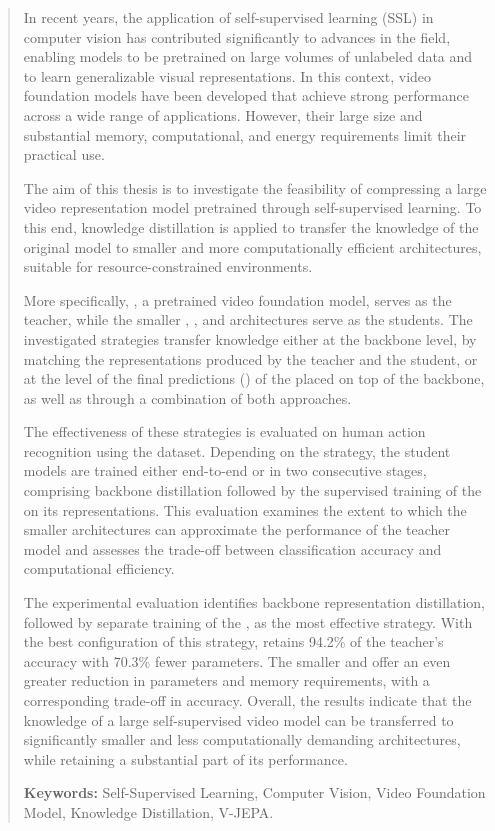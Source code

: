 \begin{abstract}

In recent years, the application of self-supervised learning (SSL) in
computer vision has contributed significantly to advances in the field,
enabling models to be pretrained on large volumes of unlabeled data and to
learn generalizable visual representations. In this context, video
foundation models have been developed that achieve strong performance across
a wide range of applications. However, their large size and substantial
memory, computational, and energy requirements limit their practical use.

The aim of this thesis is to investigate the feasibility of compressing a
large video representation model pretrained through self-supervised learning.
To this end, knowledge distillation is applied to transfer the knowledge of
the original model to smaller and more computationally efficient
architectures, suitable for resource-constrained environments.

More specifically, , a pretrained video foundation model,
serves as the teacher, while the smaller , , and
 architectures serve as the students. The investigated strategies
transfer knowledge either at the backbone level, by matching the
representations produced by the teacher and the student, or at the level
of the final predictions () of the 
placed on top of the backbone, as well as through a combination of both
approaches.

The effectiveness of these strategies is evaluated on human action
recognition using the  dataset. Depending on the strategy, the
student models are trained either end-to-end or in two consecutive stages,
comprising backbone distillation followed by the supervised training of the
 on its representations. This evaluation examines
the extent to which the smaller architectures can approximate the
performance of the teacher model and assesses the trade-off between
classification accuracy and computational efficiency.

The experimental evaluation identifies backbone representation
distillation, followed by separate training of the
, as the most effective strategy. With the best
configuration of this strategy,  retains 94.2\% of the
teacher's accuracy with 70.3\% fewer parameters. The smaller
 and  offer an even greater reduction in
parameters and memory requirements, with a corresponding trade-off in
accuracy. Overall, the results indicate that the knowledge of a large
self-supervised video model can be transferred to significantly smaller and
less computationally demanding architectures, while retaining a substantial
part of its performance.

\noindent\textbf{Keywords:} Self-Supervised Learning, Computer Vision, Video Foundation Model, Knowledge Distillation, V-JEPA.
\end{abstract}

